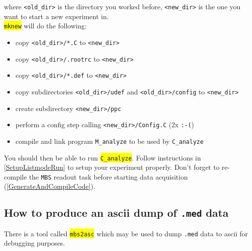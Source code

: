 \documentclass[10pt]{article}
\newcommand{\yellow}[1]{\colorbox{yellow}{\texttt{#1}}}
\begin{document}
where \texttt{<old\_dir>} is the directory you worked before, \texttt{<new\_dir>} is the one you want to start a new experiment in.\\

\yellow{mknew} will do the following:

\begin{center}
\begin{itemize}
\setlength{\rightmargin}{1em}%
\setlength{\leftmargin}{2em}%
\setlength{\itemsep}{0pt}%
\setlength{\parskip}{1mm}%
\setlength{\partopsep}{0pt}%
\setlength{\parsep}{0pt}%
\setlength{\topsep}{0pt}%
\item	copy \texttt{<old\_dir>/*.C} to \texttt{<new\_dir>}
\item	copy \texttt{<old\_dir>/.rootrc} to \texttt{<new\_dir>}
\item	copy \texttt{<old\_dir>/*.def} to \texttt{<new\_dir>}
\item	copy subdirectories \texttt{<old\_dir>/udef} and \texttt{<old\_dir>/config} to \texttt{<new\_dir>}
\item	create subdirectory \texttt{<new\_dir>/ppc}
\item	perform a config step calling \texttt{<new\_dir>/Config.C} (2x \texttt{:-(})
\item	compile and link program \texttt{M\_analyze} to be used by \texttt{C\_analyze}
\end{itemize}
\end{center}

You should then be able to run \yellow{C\_analyze}. Follow instructions in \ref{SetupListmodeRun} to setup your experiment properly.
Don't forget to re-compile the \texttt{MBS} readout task before starting data acquisition (\ref{GenerateAndCompileCode}).
\newpage
\subsection{How to produce an ascii dump of \texttt{.med} data}\label{ProduceAsciiDump}\vspace{3mm}

There is a tool called \yellow{mbs2asc} which may be used to dump \texttt{.med} data to ascii for debugging purposes.\\
\end{document}

